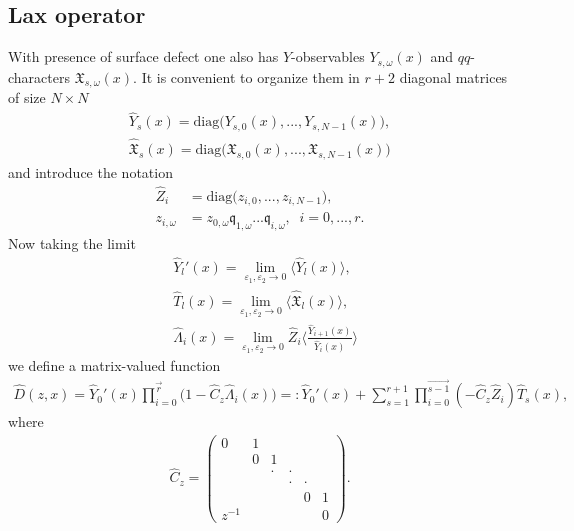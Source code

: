 \documentclass[12pt]{article}
\numberwithin{equation}{section}
\theoremstyle{definition}
\begin{document}
\subsection{Lax operator}
With presence of surface defect one also has $Y$-observables $Y_{s,\omega}(x)$ and $qq$-characters $\mathfrak{X}_{s, \omega}(x)$. It is convenient to organize them in $r+2$ diagonal matrices of size $N \times N$
\begin{align*}
    \hat{Y}_{s}(x) = \mathrm{diag} \big( Y_{s, 0}(x), ..., Y_{s, N-1}(x) \big),\\
    \hat{\mathfrak{X}}_{s}(x) = \mathrm{diag} \big( \mathfrak{X}_{s, 0}(x), ..., \mathfrak{X}_{s, N-1}(x) \big)
\end{align*}
and introduce the notation
\begin{align*}
\hat{Z}_{i} &= \mathrm{diag} \big( z_{i,0} , ..., z_{i, N-1} \big),\\
     z_{i, \omega} &= z_{0,\omega} \mathfrak{q}_{1, \omega} ... \mathfrak{q}_{i, \omega}, \;\; i = 0, ..., r.
\end{align*}
Now taking the limit
\begin{align*}
    &\hat{Y}_{l}'(x) = \lim\limits_{\varepsilon_1 , \varepsilon_2 \rightarrow 0} \langle \hat{Y}_{l}(x) \rangle,\\
    &\hat{T}_{l}(x) = \lim\limits_{\varepsilon_1 , \varepsilon_2 \rightarrow 0}  \langle \hat{\mathfrak{X}}_{l}(x) \rangle ,\\
    &\hat{\Lambda}_{i}(x) = \lim\limits_{\varepsilon_1 , \varepsilon_2 \rightarrow 0} \hat{Z}_{i} \langle \frac{\hat{Y}_{i+1}(x)}{\hat{Y}_{i}(x)}\rangle
\end{align*}
we define a matrix-valued function
\begin{align*}
    \hat{D}(z, x) = \hat{Y}_{0}'(x)\prod\limits_{i = 0}^{\overset{\longrightarrow}{r}}\big( 1 - \hat{C}_{z} \hat{\Lambda}_{i}(x)\big) = : \hat{Y}_{0}'(x) + \sum\limits_{s = 1}^{r+1}\prod\limits_{i = 0}^{\overset{\longrightarrow}{s-1}}(-\hat{C}_{z}\hat{Z}_{i}) \hat{T}_{s}(x),
\end{align*}
where
\begin{align*}
    \hat{C}_{z} = 
    \begin{pmatrix}
        0 & 1\\
          & 0 & 1\\
          &   & \cdot & \cdot\\
          &   &  & \cdot & \cdot\\
          &   &  &  & 0 & 1\\
         z^{-1} &  &  &  &      & 0  
    \end{pmatrix}.
\end{align*}
\end{document}
